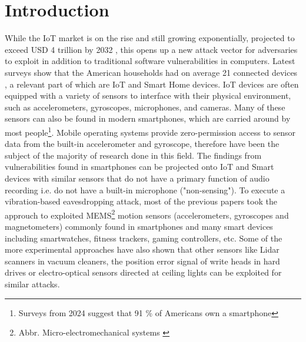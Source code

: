 \documentclass[sigconf, nonacm]{acmart}
\begin{document}




\maketitle

\section{Introduction}
While the IoT market is on the rise and still growing exponentially, projected to exceed USD 4 trillion by 2032 \cite{FortuneBusinessInsights2024}, this opens up a new attack vector for adversaries to exploit in addition to traditional software vulnerabilities in computers.
Latest surveys show that the American households had on average 21 connected devices \cite{DeloitteConnectedConsumer2023}, a relevant part of which are IoT and Smart Home devices.
IoT devices are often equipped with a variety of sensors to interface with their physical environment, such as accelerometers, gyroscopes, microphones, and cameras.
Many of these sensors can also be found in modern smartphones, which are carried around by most people\footnote{Surveys from 2024 suggest that 91 \% of Americans own a smartphone}. Mobile operating systems provide zero-permission access to sensor data from the built-in accelerometer and gyroscope, therefore have been the subject of the majority of research done in this field.
The findings from vulnerabilities found in smartphones can be projected onto IoT and Smart devices with similar sensors that do not have a primary function of audio recording i.e. do not have a built-in microphone ("non-sensing").
To execute a vibration-based eavesdropping attack, most of the previous papers took the approuch to exploited MEMS\footnote{Abbr. Micro-electromechanical systems \cite{PewResearchMobileFactSheet2024}} motion sensors (accelerometers, gyroscopes and magnetometers) commonly found in smartphones and many smart devices including smartwatches, fitness trackers, gaming controllers, etc.
Some of the more experimental approaches have also shown that other sensors like Lidar scanners in vacuum cleaners, the position error signal of write heads in hard drives or electro-optical sensors directed at ceiling lights can be exploited for similar attacks.
\end{document}
